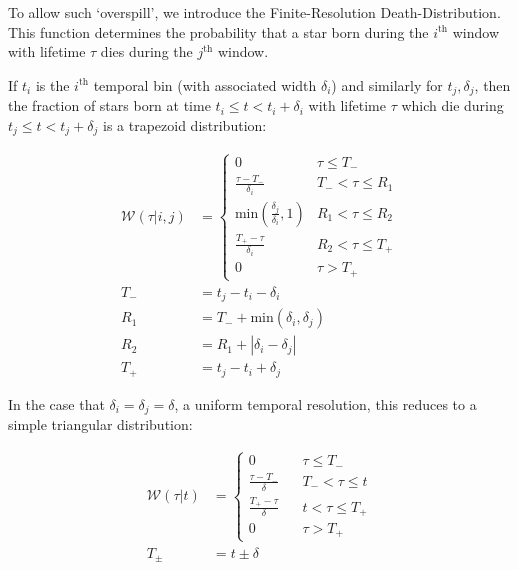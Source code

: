 \documentclass[a4paper,11pt]{article}
\begin{document}
			\def\W{\mathcal{W}}
			To allow such `overspill', we introduce the Finite-Resolution Death-Distribution. This function determines the probability that a star born during the $i^\text{th}$ window with lifetime $\tau$ dies during the $j^\text{th}$ window.

			If $t_i$ is the $i^\text{th}$ temporal bin (with associated width $\delta_i$) and similarly for $t_j, \delta_j$, then the fraction of stars born at time $t_i \leq t < t_i + \delta_i$ with lifetime $\tau$ which die during $t_j \leq t < t_j + \delta_j$ is a trapezoid distribution:

			\begin{align}
				\W(\tau|i,j) & = \begin{cases} 0 & \tau \leq T_-
					\\
					\frac{\tau - T_-}{\delta_i} ~~~~& T_- < \tau \leq R_1
					\\
					\text{min}\left(\frac{\delta_j}{\delta_i}, 1\right) & R_1 < \tau \leq R_2
					\\
					\frac{T_+ - \tau}{\delta_i} & R_2 < \tau \leq T_+
					\\
					0 & \tau > T_+
				\end{cases}
				\\
				T_- & =  t_j - t_i - \delta_i
				\\
				R_1 & = T_- + \text{min}(\delta_i, \delta_j)
				\\
				R_2 & = R_1 + |\delta_i - \delta_j|
				\\
				T_+ & = t_j - t_i + \delta_j
			\end{align}


				In the case that $\delta_i = \delta_j = \delta$, a uniform temporal resolution, this reduces to a simple triangular distribution:

				\begin{align}
					\W(\tau|t) & = \begin{cases} 0 & \tau \leq T_-
						\\
						\frac{\tau - T_-}{\delta} ~~~~& T_- < \tau \leq t
						\\
						\frac{T_+ - \tau}{\delta} &  t < \tau \leq T_+
						\\
						0 & \tau > T_+
					\end{cases}
					\\
					T_\pm & =  t \pm \delta
				\end{align}

\end{document}
